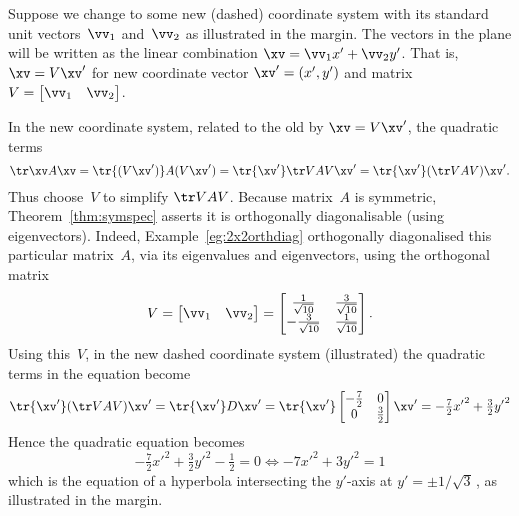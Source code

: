 \begin{example}
\begin{solution}
{}%
Suppose we change to some new (dashed) coordinate system with its standard unit vectors~\(\vv_1\) and~\(\vv_2\) as illustrated in the margin.
The vectors in the plane will be written as the linear combination \(\xv=\vv_1x'+\vv_2y'\).
That is, \(\xv=V\xv'\) for new coordinate vector \(\xv'=(x',y')\) and matrix \(V=\begin{bmatrix} \vv_1&\vv_2 \end{bmatrix}\).

In the new coordinate system, related to the old by \(\xv=V\xv'\), the quadratic terms 
\begin{equation*}
\tr\xv A\xv
=\tr{(V\xv')} A(V\xv')
=\tr{\xv'}\tr VAV\xv'
=\tr{\xv'}(\tr VAV)\xv'.
\end{equation*}
Thus choose~\(V\) to simplify \(\tr VAV\).
Because matrix~\(A\) is symmetric, Theorem~\ref{thm:symspec} asserts it is orthogonally diagonalisable (using eigenvectors).
Indeed, Example~\ref{eg:2x2orthdiag} orthogonally diagonalised this particular matrix~\(A\), via its eigenvalues and eigenvectors, using the orthogonal matrix
\begin{equation*}
V=\begin{bmatrix} \vv_1&\vv_2 \end{bmatrix}
=\begin{bmatrix} \frac1{\sqrt{10}} & \frac3{\sqrt{10}}
\\ -\frac3{\sqrt{10}}& \frac1{\sqrt{10}} \end{bmatrix}.
\end{equation*}
Using this~\(V\), in the new dashed coordinate system (illustrated) the quadratic terms in the equation become
\begin{equation*}
\tr{\xv'}(\tr VAV)\xv'
=\tr{\xv'}D\xv'
=\tr{\xv'}\begin{bmatrix} -\tfrac72&0\\0&\tfrac32 \end{bmatrix}\xv'
=-\tfrac72{x'}^2+\tfrac32{y'}^2
\end{equation*}
Hence the quadratic equation becomes
%
\begin{equation*}
-\tfrac72{x'}^2+\tfrac32{y'}^2-\tfrac12=0
\iff -7{x'}^2+3{y'}^2=1
\end{equation*}
which is the equation of a hyperbola intersecting the \(y'\)-axis at \(y'=\pm1/\sqrt3\)\,, as illustrated in the margin.
\end{solution}
\end{example}





